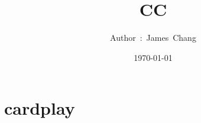 

\title{CC}
\author{ {\Biohazard} \hspace{1.5mm} \hspace{1.5mm} Author\ :\ James\ Chang}
\date{\today}


\large

\tableofcontents

\chapter{cardplay}




